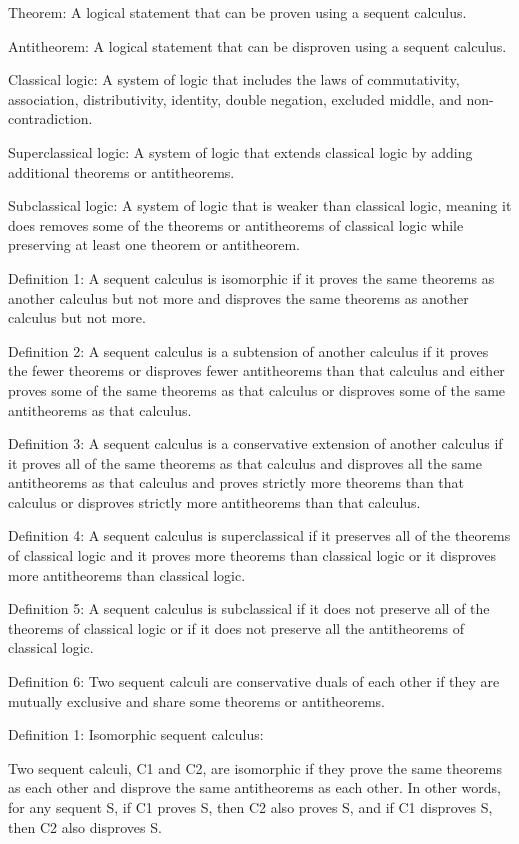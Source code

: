 Theorem: A logical statement that can be proven using a sequent calculus.

Antitheorem: A logical statement that can be disproven using a sequent calculus.

Classical logic: A system of logic that includes the laws of commutativity, association, distributivity, identity, double negation, excluded middle, and non-contradiction.

Superclassical logic: A system of logic that extends classical logic by adding additional theorems or antitheorems.

Subclassical logic: A system of logic that is weaker than classical logic, meaning it does removes some of the theorems or antitheorems of classical logic while preserving at least one theorem or antitheorem.

Definition 1: A sequent calculus is isomorphic if it proves the same theorems as another calculus but not more and disproves the same theorems as another calculus but not more.

Definition 2: A sequent calculus is a subtension of another calculus if it proves the fewer theorems or disproves fewer antitheorems than that calculus and either proves some of the same theorems as that calculus or disproves some of the same antitheorems as that calculus.

Definition 3: A sequent calculus is a conservative extension of another calculus if it proves all of the same theorems as that calculus and disproves all the same antitheorems as that calculus and proves strictly more theorems than that calculus or disproves strictly more antitheorems than that calculus.

Definition 4: A sequent calculus is superclassical if it preserves all of the theorems of classical logic and it proves more theorems than classical logic or it disproves more antitheorems than classical logic.

Definition 5: A sequent calculus is subclassical if it does not preserve all of the theorems of classical logic or if it does not preserve all the antitheorems of classical logic.

Definition 6: Two sequent calculi are conservative duals of each other if they are mutually exclusive and share some theorems or antitheorems.

Definition 1: Isomorphic sequent calculus:

Two sequent calculi, C1 and C2, are isomorphic if they prove the same theorems as each other and disprove the same antitheorems as each other. In other words, for any sequent S, if C1 proves S, then C2 also proves S, and if C1 disproves S, then C2 also disproves S.

